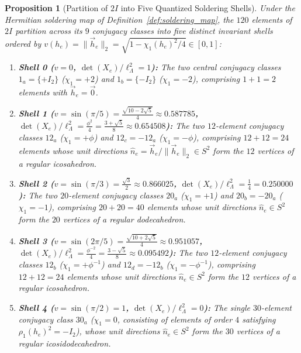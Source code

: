 \documentclass[11pt,a4paper]{article}
\newtheorem{proposition}[theorem]{Proposition}
\theoremstyle{definition}
\theoremstyle{remark}
\begin{document}
\begin{proposition}[Partition of $2I$ into Five Quantized Soldering Shells]
\label{prop:five_shells}
Under the Hermitian soldering map of Definition~\ref{def:soldering_map}, the $120$ elements of $2I$ partition across its $9$ conjugacy classes into five distinct invariant shells ordered by $v(h_e) = \|\vec{h}_e\|_2 = \sqrt{1 - \chi_1(h_e)^2/4} \in [0, 1]$:
\begin{enumerate}
    \item \textbf{Shell 0 ($v = 0$, $\det(X_e)/\ell_\Lambda^2 = 1$):} The two central conjugacy classes $1_a = \{+I_2\}$ ($\chi_1 = +2$) and $1_b = \{-I_2\}$ ($\chi_1 = -2$), comprising $1 + 1 = 2$ elements with $\vec{h}_e = \vec{0}$.
    \item \textbf{Shell 1 ($v = \sin(\pi/5) = \frac{\sqrt{10 - 2\sqrt{5}}}{4} \approx 0.587785$, $\det(X_e)/\ell_\Lambda^2 = \frac{\phi^2}{4} = \frac{3+\sqrt{5}}{8} \approx 0.654508$):} The two $12$-element conjugacy classes $12_a$ ($\chi_1 = +\phi$) and $12_c = -12_a$ ($\chi_1 = -\phi$), comprising $12 + 12 = 24$ elements whose unit directions $\hat{n}_e = \vec{h}_e/\|\vec{h}_e\|_2 \in S^2$ form the $12$ vertices of a regular icosahedron.
    \item \textbf{Shell 2 ($v = \sin(\pi/3) = \frac{\sqrt{3}}{2} \approx 0.866025$, $\det(X_e)/\ell_\Lambda^2 = \frac{1}{4} = 0.250000$):} The two $20$-element conjugacy classes $20_a$ ($\chi_1 = +1$) and $20_b = -20_a$ ($\chi_1 = -1$), comprising $20 + 20 = 40$ elements whose unit directions $\hat{n}_e \in S^2$ form the $20$ vertices of a regular dodecahedron.
    \item \textbf{Shell 3 ($v = \sin(2\pi/5) = \frac{\sqrt{10 + 2\sqrt{5}}}{4} \approx 0.951057$, $\det(X_e)/\ell_\Lambda^2 = \frac{\phi^{-2}}{4} = \frac{3-\sqrt{5}}{8} \approx 0.095492$):} The two $12$-element conjugacy classes $12_b$ ($\chi_1 = +\phi^{-1}$) and $12_d = -12_b$ ($\chi_1 = -\phi^{-1}$), comprising $12 + 12 = 24$ elements whose unit directions $\hat{n}_e \in S^2$ form the $12$ vertices of a regular icosahedron.
    \item \textbf{Shell 4 ($v = \sin(\pi/2) = 1$, $\det(X_e)/\ell_\Lambda^2 = 0$):} The single $30$-element conjugacy class $30_a$ ($\chi_1 = 0$, consisting of elements of order $4$ satisfying $\rho_1(h_e)^2 = -I_2$), whose unit directions $\hat{n}_e \in S^2$ form the $30$ vertices of a regular icosidodecahedron.
\end{enumerate}
\end{proposition}
\end{document}
